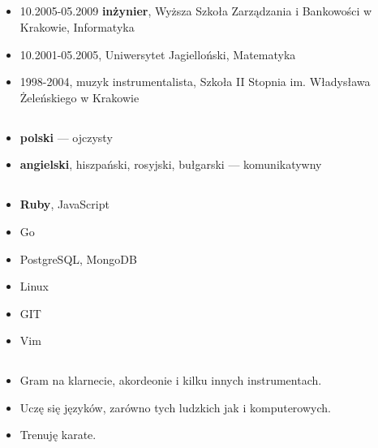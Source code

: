 \documentclass[a4paper]{article}
\begin{document}
\subsection*{}
\begin{itemize}
  \item
    10.2005-05.2009 \textbf{inżynier}, Wyższa Szkoła Zarządzania i Bankowości w Krakowie, Informatyka

  \item
    10.2001-05.2005, Uniwersytet Jagielloński, Matematyka

  \item
    1998-2004, muzyk instrumentalista,
    Szkoła II Stopnia im. Władysława Żeleńskiego w Krakowie
\end{itemize}

\subsection*{}
\begin{itemize}
\item
  \textbf{polski} --- ojczysty
\item
  \textbf{angielski}, hiszpański, rosyjski, bułgarski --- komunikatywny
\end{itemize}

\subsection*{}
\begin{itemize}
\item
  \textbf{Ruby}, JavaScript
\item
  Go
\item
  PostgreSQL, MongoDB
\item
  Linux
\item
  GIT
\item
  Vim
\end{itemize}

\subsection*{}
\begin{itemize}
\item
  Gram na klarnecie, akordeonie i kilku innych instrumentach.
\item
  Uczę się języków, zarówno tych ludzkich jak i komputerowych.
\item
  Trenuję karate.
\end{itemize}
\end{document}
